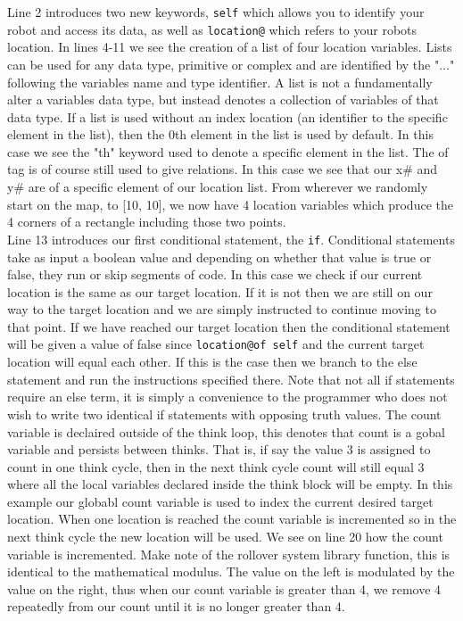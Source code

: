 \documentclass[a4paper]{article}
\begin{document}
Line 2 introduces two new keywords, \texttt{self} which allows you to identify your robot and access its data, as well as \texttt{location@} which refers to  your robots location. In  lines 4-11 we see the creation of a list of four location variables. Lists can be used for any data type, primitive or complex and are identified by the "..." following the variables name and type identifier. A list is not a fundamentally alter a variables data type, but instead denotes a collection of variables of that data type. If a list is used without an index location (an identifier to the specific element in the list), then the 0th element in the list is used by default. In this case we see the "th" keyword used to denote a specific element in the list. The of tag is of course still used to give relations. In this case we see that our x\# and y\# are of a specific element of our location list. From wherever we randomly start on the map, to [10, 10], we now have 4 location variables which produce the 4 corners of a rectangle including those two points.\\

Line 13 introduces our first conditional statement, the \texttt{if}. Conditional statements take as input a boolean value and depending on whether that value is true or false, they run or skip segments of code. In this case we check if our current location is the same as our target location. If it is not then we are still on our way to the target location and we are simply instructed to continue moving to that point. If we have reached our target location then the conditional statement will be given a value of false since \texttt{location@of self} and the current target location will equal each other. If this is the case then we branch to the else statement and run the instructions specified there. Note that not all if statements require an else term, it is simply a convenience to the programmer who does not wish to write two identical if statements with opposing truth values. The count variable is declaired outside of the think loop, this denotes that count is a gobal variable and persists between thinks. That is, if say the value 3 is assigned to count in one think cycle, then in the next think cycle count will still equal 3 where all the local variables declared inside the think block will be empty. In this example our globabl count variable is used to index the current desired target location. When one location is reached the count variable is incremented so in the next think cycle the new location will be used. We see on line 20 how the count variable is incremented. Make note of the rollover system library function, this is identical to the mathematical modulus. The value on the left is modulated by the value on the right, thus when our count variable is greater than 4, we remove 4 repeatedly from our count until it is no longer greater than 4.\\
\end{document}
